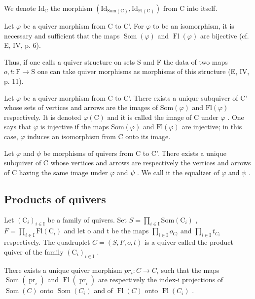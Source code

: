 We denote \(\mathrm{Id}_{\mathrm{C}}\) the morphism \((\mathrm{Id}_{\mathrm{Som}(\mathrm{C})}, \mathrm{Id}_{\mathrm{Fl}(\mathrm{C})})\) from C into itself.

Let \(\varphi\) be a quiver morphism from C to C'. For \(\varphi\) to be an isomorphism, it is necessary and sufficient that the maps \(\operatorname{Som}(\varphi)\) and \(\operatorname{Fl}(\varphi)\) are bijective (cf. E, IV, p. 6).

Thus, if one calls a quiver structure on sets S and F the data of two maps \(o, t: \mathrm{F} \to \mathrm{S}\) one can take quiver morphisms as morphisms of this structure (E, IV, p. 11).

Let \(\varphi\) be a quiver morphism from C to C'. There exists a unique subquiver of C' whose sets of vertices and arrows are the images of \(\mathrm{Som}(\varphi)\) and \(\mathrm{Fl}(\varphi)\) respectively. It is denoted \(\varphi(\mathrm{C})\) and it is called the image of C under \(\varphi\) . One says that \(\varphi\) is injective if the maps \(\mathrm{Som}(\varphi)\) and \(\mathrm{Fl}(\varphi)\) are injective; in this case, \(\varphi\) induces an isomorphism from C onto its image.

Let \(\varphi\) and \(\psi\) be morphisms of quivers from C to C'. There exists a unique subquiver of C whose vertices and arrows are respectively the vertices and arrows of C having the same image under \(\varphi\) and \(\psi\) . We call it the equalizer of \(\varphi\) and \(\psi\) .

\subsection{Products of quivers}

Let \((\mathrm{C}_{i})_{i\in\mathrm{I}}\) be a family of quivers. Set \(S = \prod_{i\in\mathrm{I}} \mathrm{Som}(\mathrm{C}_{i})\) , \(F = \prod_{i\in\mathrm{I}} \mathrm{Fl}(\mathrm{C}_{i})\) and let o and t be the maps \(\prod_{i\in\mathrm{I}} o_{C_{i}}\) and \(\prod_{i\in\mathrm{I}} t_{C_{i}}\) respectively. The quadruplet \(C = (S, F, o, t)\) is a quiver called the product quiver of the family \((\mathrm{C}_{i})_{i\in\mathrm{I}}\) .

There exists a unique quiver morphism \(pr_{i}: C \to C_{i}\) such that the maps \(\operatorname{Som}(\operatorname{pr}_{i})\) and \(\operatorname{Fl}(\operatorname{pr}_{i})\) are respectively the index-i projections of \(\operatorname{Som}(C)\) onto \(\operatorname{Som}(C_{i})\) and of \(\operatorname{Fl}(C)\) onto \(\operatorname{Fl}(C_{i})\) .

